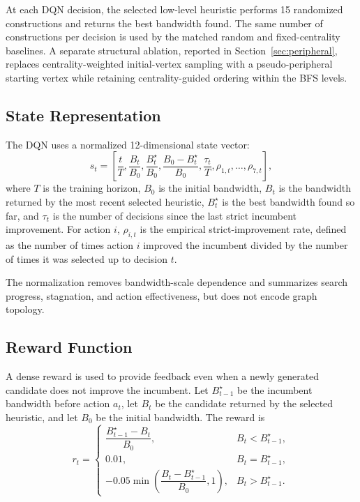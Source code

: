 \documentclass[runningheads]{llncs}
\begin{document}
At each DQN decision, the selected low-level heuristic performs 15 randomized constructions and returns the best bandwidth found. The same number of constructions per decision is used by the matched random and fixed-centrality baselines. A separate structural ablation, reported in Section~\ref{sec:peripheral}, replaces centrality-weighted initial-vertex sampling with a pseudo-peripheral starting vertex while retaining centrality-guided ordering within the BFS levels.

\subsection{State Representation}

The DQN uses a normalized 12-dimensional state vector:
\[
s_t =
\left[
\frac{t}{T},
\frac{B_t}{B_0},
\frac{B_t^\star}{B_0},
\frac{B_0-B_t^\star}{B_0},
\frac{\tau_t}{T},
\rho_{1,t},\ldots,\rho_{7,t}
\right],
\]
where $T$ is the training horizon, $B_0$ is the initial bandwidth, $B_t$ is the bandwidth returned by the most recent selected heuristic, $B_t^\star$ is the best bandwidth found so far, and $\tau_t$ is the number of decisions since the last strict incumbent improvement. For action $i$, $\rho_{i,t}$ is the empirical strict-improvement rate, defined as the number of times action $i$ improved the incumbent divided by the number of times it was selected up to decision $t$.

The normalization removes bandwidth-scale dependence and summarizes search progress, stagnation, and action effectiveness, but does not encode graph topology.

\subsection{Reward Function}

A dense reward is used to provide feedback even when a newly generated candidate does not improve the incumbent. Let $B^\star_{t-1}$ be the incumbent bandwidth before action $a_t$, let $B_t$ be the candidate returned by the selected heuristic, and let $B_0$ be the initial bandwidth. The reward is
\[
r_t =
\begin{cases}
\dfrac{B^\star_{t-1}-B_t}{B_0}, & B_t < B^\star_{t-1},\\[7pt]
0.01, & B_t = B^\star_{t-1},\\[5pt]
-0.05\min\!\left(\dfrac{B_t-B^\star_{t-1}}{B_0},1\right), & B_t > B^\star_{t-1}.
\end{cases}
\]
\end{document}
